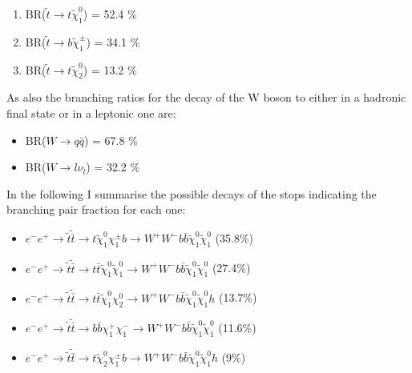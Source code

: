 \documentclass[12pt,a4paper]{report}
\begin{document}
\newpage

\begin{enumerate}
 \item BR($\tilde{t}\rightarrow t \tilde{\chi}_{1}^{0}$) = 52.4 \%
 \item BR($\tilde{t}\rightarrow b \tilde{\chi}_{1}^{\pm}$) = 34.1 \%
 \item BR($\tilde{t}\rightarrow t \tilde{\chi}_{2}^{0}$) = 13.2 \%
 \end{enumerate}

As also the branching ratios for the decay of the W boson to either in a hadronic final state or in
a leptonic one are:

\begin{itemize}
 \item BR($W\rightarrow q\bar{q}$) = 67.8 \% 
 \item BR($W\rightarrow l\nu_{l}$) = 32.2 \%
\end{itemize}

In the following I summarise the possible decays of the stops indicating the branching pair fraction
for each one:

\begin{itemize}
 \item $e^{-}e^{+} \rightarrow \tilde{t}\tilde{\bar{t}} \rightarrow t \tilde{\chi}_{1}^{0}
 \chi^{\pm}_{1}b \rightarrow
 W^{+}W^{-} b \bar{b} \tilde{\chi}_{1}^{0}  \tilde{\chi}_{1}^{0}$ \quad (35.8\%)

 \item $e^{-}e^{+} \rightarrow \tilde{t}\tilde{\bar{t}} \rightarrow t\bar{t} \tilde{\chi}_{1}^{0}
 \tilde{\chi}^{0}_{1} \rightarrow
 W^{+}W^{-} b \bar{b} \tilde{\chi}_{1}^{0}  \tilde{\chi}_{1}^{0}$ \quad (27.4\%)

 \item $e^{-}e^{+} \rightarrow \tilde{t}\tilde{\bar{t}} \rightarrow t\bar{t} \tilde{\chi}_{1}^{0}
 \chi^{0}_{2} \rightarrow
 W^{+}W^{-} b \bar{b} \tilde{\chi}_{1}^{0}  \tilde{\chi}_{1}^{0}h$ \quad (13.7\%)
 
 \item $e^{-}e^{+} \rightarrow \tilde{t}\tilde{\bar{t}} \rightarrow b\bar{b} \chi_{1}^{+}
 \chi^{-}_{1} \rightarrow
 W^{+}W^{-} b \bar{b} \tilde{\chi}_{1}^{0}  \tilde{\chi}_{1}^{0}$ \quad (11.6\%)
 
 \item $e^{-}e^{+} \rightarrow \tilde{t}\tilde{\bar{t}} \rightarrow t \tilde{\chi}_{2}^{0}
 \chi^{\pm}_{1}b \rightarrow
 W^{+}W^{-} b \bar{b} \tilde{\chi}_{1}^{0}  \tilde{\chi}_{1}^{0}h$ \quad (9\%)
 
 \end{itemize}
\end{document}
